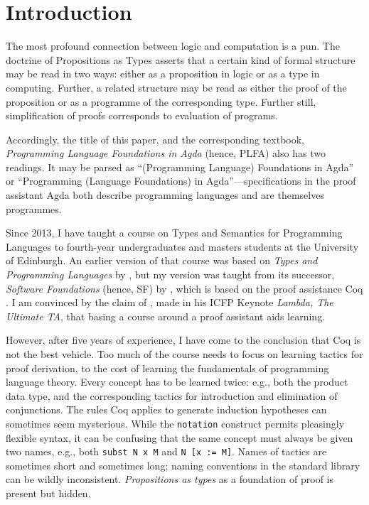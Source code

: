 \documentclass[preprint,authoryear]{elsarticle}
\begin{document}
\maketitle

\section{Introduction}

The most profound connection between logic and computation is a pun.
The doctrine of Propositions as Types asserts that a certain kind of formal
structure may be read in two ways: either as a proposition in logic or
as a type in computing.  Further, a related structure may be read as
either the proof of the proposition or as a programme of the
corresponding type.  Further still, simplification of proofs
corresponds to evaluation of programs.

Accordingly, the title of this paper, and the corresponding textbook,
\emph{Programming Language Foundations in Agda} (hence, PLFA)
also has two readings.  It may be parsed as ``(Programming Language)
Foundations in Agda'' or ``Programming (Language Foundations) in
Agda''---specifications in the proof assistant Agda both describe
programming languages and are themselves programmes.

Since 2013, I have taught a course on Types and Semantics for
Programming Languages to fourth-year undergraduates and masters
students at the University of Edinburgh.  An earlier version of that
course was based on \emph{Types and Programming Languages} by
\citet{Pierce-2002}, but my version was taught from its successor,
\emph{Software Foundations} (hence, SF) by \citet{Pierce-et-al-2010},
which is based on the proof assistance Coq \citep{Huet-et-al-1997}.
I am convinced by the claim of \citet{Pierce-2009}, made in his ICFP
Keynote \emph{Lambda, The Ultimate TA}, that basing a course around a
proof assistant aids learning.

However, after five years of experience, I have come to the conclusion
that Coq is not the best vehicle.  Too much of the course needs to
focus on learning tactics for proof derivation, to the cost of
learning the fundamentals of programming language theory.  Every
concept has to be learned twice: e.g., both the product data type, and
the corresponding tactics for introduction and elimination of
conjunctions.  The rules Coq applies to generate induction hypotheses
can sometimes seem mysterious.  While the \texttt{notation} construct
permits pleasingly flexible syntax, it can be confusing that the same
concept must always be given two names, e.g., both
\texttt{subst~N~x~M} and \texttt{N~[x~:=~M]}.  Names of tactics are
sometimes short and sometimes long; naming conventions in the standard
library can be wildly inconsistent.  \emph{Propositions as types} as a
foundation of proof is present but hidden.
\end{document}
